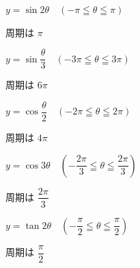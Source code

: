 \QQ
  {$y=\sin2\theta\quad(-\pi\leqq\theta\leqq\pi)$}
  {\begin{minipage}[t]{0.98\linewidth}%
     \vspace{0pt}%
     周期は $\pi$
   \end{minipage}}
\QQ
  {$y=\sin\dfrac{\theta}{3}\quad(-3\pi\leqq\theta\leqq3\pi)$}
  {\begin{minipage}[t]{0.98\linewidth}%
     \vspace{0pt}%
     周期は $6\pi$
   \end{minipage}}
\QQ
  {$y=\cos\dfrac{\theta}{2}\quad(-2\pi\leqq\theta\leqq2\pi)$}
  {\begin{minipage}[t]{0.98\linewidth}%
     \vspace{0pt}%
     周期は $4\pi$
   \end{minipage}}
\AnswerColumnBreak
\QQ
  {$y=\cos3\theta\quad\left(-\dfrac{2\pi}{3}\leqq\theta\leqq\dfrac{2\pi}{3}\right)$}
  {\begin{minipage}[t]{0.98\linewidth}%
     \vspace{0pt}%
     周期は $\dfrac{2\pi}{3}$
   \end{minipage}}
\QQ
  {$y=\tan2\theta\quad\left(-\dfrac{\pi}{2}\leqq\theta\leqq\dfrac{\pi}{2}\right)$}
  {\begin{minipage}[t]{0.98\linewidth}%
     \vspace{0pt}%
     周期は $\dfrac{\pi}{2}$
   \end{minipage}}

